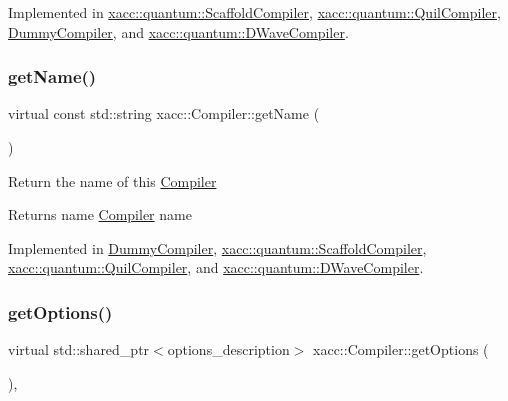 Implemented in \hyperlink{a00936_a3736ecc229fe6acdd4c991e85d7a1f08}{xacc\+::quantum\+::\+Scaffold\+Compiler}, \hyperlink{a00908_adf4d321ecb0df3fa7728999f941c83b2}{xacc\+::quantum\+::\+Quil\+Compiler}, \hyperlink{a00972_a2f9bb3d30bb11f12b530854a11c8fb25}{Dummy\+Compiler}, and \hyperlink{a00948_a893e1d1c81a8aaf6e2435c9bceab575e}{xacc\+::quantum\+::\+D\+Wave\+Compiler}.

\mbox{\label{a01100_a87fca9100e6462122f5b687c3a0fb3fb}} 
\subsubsection{\texorpdfstring{get\+Name()}{getName()}}
{\footnotesize\ttfamily virtual const std\+::string xacc\+::\+Compiler\+::get\+Name (\begin{DoxyParamCaption}{ }\end{DoxyParamCaption})\hspace{0.3cm}{\ttfamily [pure virtual]}}

Return the name of this \hyperlink{a01100}{Compiler} \begin{DoxyReturn}{Returns}
name \hyperlink{a01100}{Compiler} name 
\end{DoxyReturn}


Implemented in \hyperlink{a00972_a76460cb78671dc2cf42f2bebf8fb80c7}{Dummy\+Compiler}, \hyperlink{a00936_a3f537054a3924a1d14f4ceb0f0181161}{xacc\+::quantum\+::\+Scaffold\+Compiler}, \hyperlink{a00908_ae7d52140b6dd52730edc6e38ae48f437}{xacc\+::quantum\+::\+Quil\+Compiler}, and \hyperlink{a00948_a8a180031ae563e1a9aac611e8066c181}{xacc\+::quantum\+::\+D\+Wave\+Compiler}.

\mbox{\label{a01100_a9f5a8965c9c2dd895016d18264ebbe92}} 
\subsubsection{\texorpdfstring{get\+Options()}{getOptions()}}
{\footnotesize\ttfamily virtual std\+::shared\+\_\+ptr$<$options\+\_\+description$>$ xacc\+::\+Compiler\+::get\+Options (\begin{DoxyParamCaption}{ }\end{DoxyParamCaption})\hspace{0.3cm}{\ttfamily [inline]}, {\ttfamily [virtual]}}

